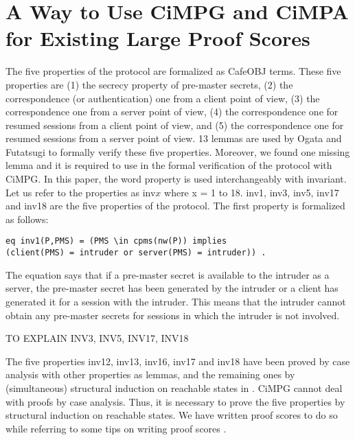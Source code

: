 \documentclass[a4paper,fleqn]{cas-dc}
\begin{document}
\section{A Way to Use CiMPG and CiMPA for Existing Large Proof Scores}\label{fvtls}
The five properties of the protocol \cite{1437139} are formalized as CafeOBJ terms. These five properties are (1) the secrecy property of pre-master secrets, (2) the correspondence (or authentication) one from a client point of view, (3) the correspondence one from a server point of view, (4) the correspondence one for resumed sessions from a client point of view, and (5) the correspondence one for resumed sessions from a server point of view. 13 lemmas are used by Ogata and Futatsugi to formally verify these five properties. Moreover, we found one missing lemma and it is required to use in the formal verification of the protocol with CiMPG. In this paper, the word property is used interchangeably with invariant. Let us refer to the properties as inv\textbf{$x$} where x = 1 to 18. inv1, inv3, inv5, inv17 and inv18 are the five properties of the protocol. The first property is formalized as follows: 
\begin{small}
\begin{verbatim}
eq inv1(P,PMS) = (PMS \in cpms(nw(P)) implies 
(client(PMS) = intruder or server(PMS) = intruder)) .
\end{verbatim}
\end{small}
The equation says that if a pre-master secret is available to the intruder as a server, the pre-master secret has been generated by the intruder or a client has generated it for a session with the intruder. This means that the intruder cannot obtain any pre-master secrets for sessions in which the intruder is not involved. 

TO EXPLAIN INV3, INV5, INV17, INV18

The five properties inv12, inv13, inv16, inv17 and inv18 have been proved by case analysis with other properties as lemmas, and the remaining ones by (simultaneous) structural induction on reachable states in \cite{1437139}. CiMPG cannot deal with proofs by case analysis. Thus, it is necessary to prove the five properties by structural induction on reachable states. We have written proof scores to do so while referring to some tips on writing proof scores \cite{Ogata2006}.
\end{document}
